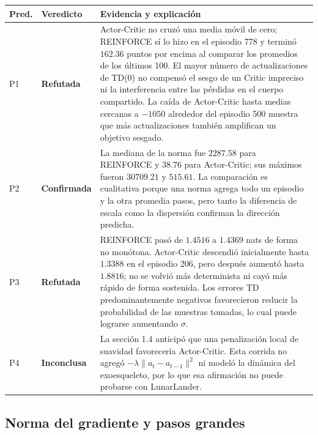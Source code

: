 \documentclass[11pt,letterpaper]{article}
\begin{document}
\begin{respuesta}
\begin{center}
\begin{tabular}{p{}p{}p{}}
\toprule
\textbf{Pred.} & \textbf{Veredicto} & \textbf{Evidencia y explicación} \\
\midrule
P1 & \textbf{Refutada} & Actor-Critic no cruzó una media móvil de cero; REINFORCE
sí lo hizo en el episodio 778 y terminó $162.36$ puntos por encima al comparar los
promedios de los últimos 100. El mayor número de actualizaciones de TD(0) no compensó
el sesgo de un Critic impreciso ni la interferencia entre las pérdidas en el cuerpo
compartido. La caída de Actor-Critic hasta medias cercanas a $-1050$ alrededor del
episodio 500 muestra que más actualizaciones también amplifican un objetivo sesgado. \\
\addlinespace
P2 & \textbf{Confirmada} & La mediana de la norma fue $2287.58$ para REINFORCE y
$38.76$ para Actor-Critic; sus máximos fueron $30709.21$ y $515.61$. La comparación es
cualitativa porque una norma agrega todo un episodio y la otra promedia pasos, pero tanto
la diferencia de escala como la dispersión confirman la dirección predicha. \\
\addlinespace
P3 & \textbf{Refutada} & REINFORCE pasó de $1.4516$ a $1.4369$ nats de forma no
monótona. Actor-Critic descendió inicialmente hasta $1.3388$ en el episodio 206, pero
después aumentó hasta $1.8816$; no se volvió más determinista ni cayó más rápido de forma
sostenida. Los errores TD predominantemente negativos favorecieron reducir la
probabilidad de las muestras tomadas, lo cual puede lograrse aumentando $\sigma$. \\
\addlinespace
P4 & \textbf{Inconclusa} & La sección 1.4 anticipó que una penalización local de
suavidad favorecería Actor-Critic. Esta corrida no agregó
$-\lambda\lVert a_t-a_{t-1}\rVert^2$ ni modeló la dinámica del exoesqueleto, por lo que
esa afirmación no puede probarse con LunarLander. \\
\bottomrule
\end{tabular}
\end{center}
\end{respuesta}

\subsection{Norma del gradiente y pasos grandes}
\end{document}
